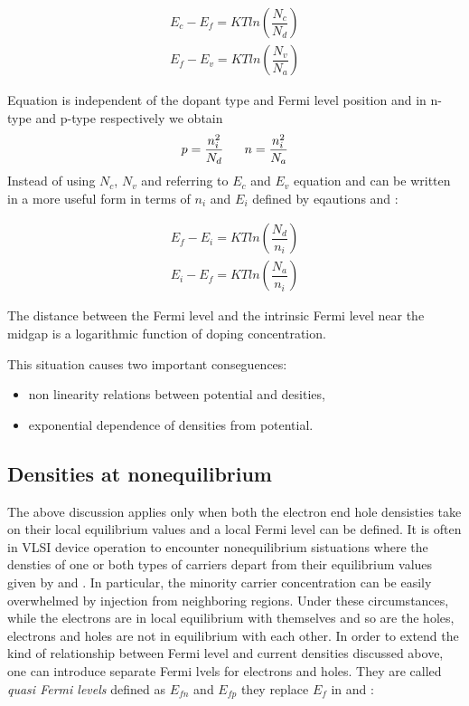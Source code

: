  \begin{align}
 E_c-E_f = KTln\left(\dfrac{N_c}{N_d}\right)  \label{eq: Ef in n-type}\\
 E_f-E_v= KTln\left(\dfrac{N_v}{N_a}\right) \label{eq: Ef in p-type}
 \end{align}

Equation  is independent of the dopant type and Fermi level position and in n-type and p-type respectively we obtain
\begin{equation}
p = \dfrac{n_i^2}{N_d} \psp{10} n = \dfrac{n_i^2}{N_a}
\end{equation}
Instead of using $N_c$, $N_v$ and referring to $E_c$ and $E_v$ equation  and  can be written in a more useful form in terms of $n_i$ and $E_i$ defined by eqautions  and :

 \begin{align}
 E_f-E_i = KTln\left(\dfrac{N_d}{n_i}\right)  \label{eq: Ef in n-type Ei} \\
 E_i-E_f = KTln\left(\dfrac{N_a}{n_i}\right)  \label{eq: Ef in p-type Ei} 
 \end{align}

\begin{Osservazione}
The distance between the Fermi level and the intrinsic Fermi level near the midgap is a logarithmic function of doping concentration.
\end{Osservazione}

This situation causes two important conseguences:
\begin{itemize}
\item non linearity relations between potential and desities,
\item exponential dependence of densities from potential.
\end{itemize}

\subsection{Densities at nonequilibrium}

The above discussion applies only when both the electron end hole densisties take on their local equilibrium values and a local Fermi level can be defined. It is often in VLSI device operation to encounter nonequilibrium sistuations where the densties of one or both types of carriers depart from their equilibrium values given by  and .
In particular, the minority carrier concentration can be easily overwhelmed by injection from neighboring regions. Under these circumstances, while the electrons are in local equilibrium with themselves and so are the holes, electrons and holes are not in equilibrium with each other. In order to extend the kind of relationship between Fermi level and current densities discussed above, one can introduce separate Fermi lvels for electrons and holes. They are called \textit{quasi Fermi levels} defined as $E_{fn}$ and $E_{fp}$ they replace $E_f$ in  and :

